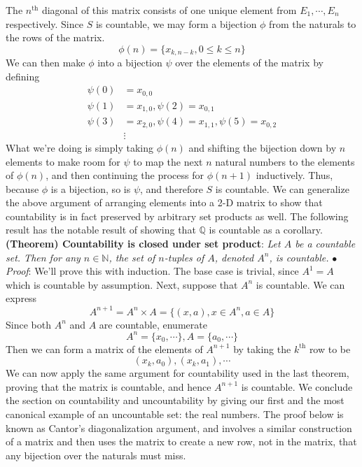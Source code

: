 \documentclass{article}
\newcommand*{\tb}{\textbf}
\newcommand*{\ti}{\textit}
\newcommand*{\n}{\newline}
\newcommand*{\nn}{\newline \newline}
\newcommand*{\Pf}{\indent \ensuremath{\bullet} \textit{Proof}: }
\newcommand*{\N}{\mathbb{N}}
\newcommand*{\Q}{\mathbb{Q}}
\begin{document}
The $ n^{\text{th}} $ diagonal of this matrix consists of one unique element from $ E_1, \cdots, E_n $ respectively. Since $ S $ is countable, we may form a bijection $ \phi $ from the naturals to the rows of the matrix.
    $$ \phi(n) = \{ x_{k, n - k}, 0 \leq k \leq n \} $$
We can then make $ \phi $ into a bijection $ \psi $ over the elements of the matrix by defining
    $$ \begin{aligned}
        \psi(0) &= x_{0, 0} \\
        \psi(1) &= x_{1, 0}, \psi(2) = x_{0, 1} \\
        \psi(3) &= x_{2, 0}, \psi(4) = x_{1, 1}, \psi(5) = x_{0, 2} \\
        &\vdots
    \end{aligned} $$
What we're doing is simply taking $ \phi(n) $ and shifting the bijection down by $ n $ elements to make room for $ \psi $ to map the next $ n $ natural numbers to the elements of $ \phi(n) $, and then continuing the process for $ \phi(n + 1) $ inductively. Thus, because $ \phi $ is a bijection, so is $ \psi $, and therefore $ S $ is countable. \qedsymbol
\nn
We can generalize the above argument of arranging elements into a 2-D matrix to show that countability is in fact preserved by arbitrary set products as well. The following result has the notable result of showing that $ \Q $ is countable as a corollary.
\nn
\tb{(Theorem) Countability is closed under set product}: \ti{Let $ A $ be a countable set. Then for any $ n \in \N $, the set of $ n $-tuples of $ A $, denoted $ A^n $, is countable.}
\n
\Pf We'll prove this with induction. The base case is trivial, since $ A^1 = A $ which is countable by assumption. Next, suppose that $ A^n $ is countable. We can express
    $$ A^{n + 1} = A^n \times A = \{ (x, a), x \in A^n, a \in A \} $$
Since both $ A^n $ and $ A $ are countable, enumerate
    $$ A^n = \{ x_0, \cdots \}, A = \{ a_0, \cdots \} $$
Then we can form a matrix of the elements of $ A^{n + 1} $ by taking the $ k^{\text{th}} $ row to be
    $$ (x_k, a_0), (x_k, a_1), \cdots $$
We can now apply the same argument for countability used in the last theorem, proving that the matrix is countable, and hence $ A^{n + 1} $ is countable. \qedsymbol
\nn
We conclude the section on countability and uncountability by giving our first and the most canonical example of an uncountable set: the real numbers. The proof below is known as Cantor's diagonalization argument, and involves a similar construction of a matrix and then uses the matrix to create a new row, not in the matrix, that any bijection over the naturals must miss.
\end{document}
